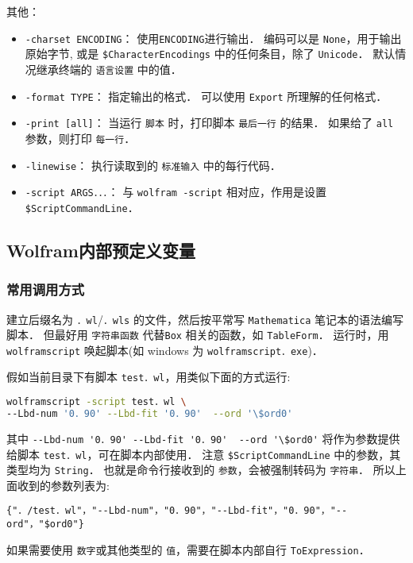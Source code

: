 其他：
\begin{itemize}
\item \verb`-charset ENCODING`： 使用\verb`ENCODING`进行输出． 编码可以是 \verb`None`，用于输出原始字节,
或是 \verb`$CharacterEncodings` 中的任何条目，除了 \verb`Unicode`． 默认情况继承终端的 \verb`语言设置` 中的值．
\item \verb`-format TYPE`： 指定输出的格式． 可以使用 \verb`Export` 所理解的任何格式．
\item \verb`-print [all]`： 当运行 \verb`脚本` 时，打印脚本 \verb`最后一行` 的结果． 如果给了 \verb`all` 参数，则打印 \verb`每一行`．
\item \verb`-linewise`： 执行读取到的 \verb`标准输入` 中的每行代码．
\item \verb`-script ARGS．．．`： 与 \verb`wolfram -script` 相对应，作用是设置 \verb`$ScriptCommandLine`．
\end{itemize}

\subsection{Wolfram内部预定义变量}

\subsubsection{常用调用方式}

建立后缀名为 \verb`．wl`/\verb`．wls` 的文件，然后按平常写 \verb`Mathematica` 笔记本的语法编写脚本．
但最好用 \verb`字符串函数` 代替\verb`Box` 相关的函数，如 \verb`TableForm`．
运行时，用 \verb`wolframscript` 唤起脚本(如 windows 为 \verb`wolframscript．exe`)．

假如当前目录下有脚本 \verb`test．wl`，用类似下面的方式运行:
\begin{lstlisting}[language=bash]
wolframscript -script test．wl \
--Lbd-num '0．90' --Lbd-fit '0．90'  --ord '\$ord0'
\end{lstlisting}

其中 \verb`--Lbd-num '0．90' --Lbd-fit '0．90'  --ord '\$ord0'` 将作为参数提供给脚本 \verb`test．wl`，可在脚本内部使用．
注意 \verb`$ScriptCommandLine` 中的参数，其类型均为 \verb`String`．
也就是命令行接收到的 \verb`参数`，会被强制转码为 \verb`字符串`．
所以上面收到的参数列表为:
\begin{lstlisting}[language=wolfram]
{"．/test．wl"，"--Lbd-num"，"0．90"，"--Lbd-fit"，"0．90"，"--ord"，"$ord0"}
\end{lstlisting}
如果需要使用 \verb`数字`或其他类型的 \verb`值`，需要在脚本内部自行 \verb`ToExpression`．

